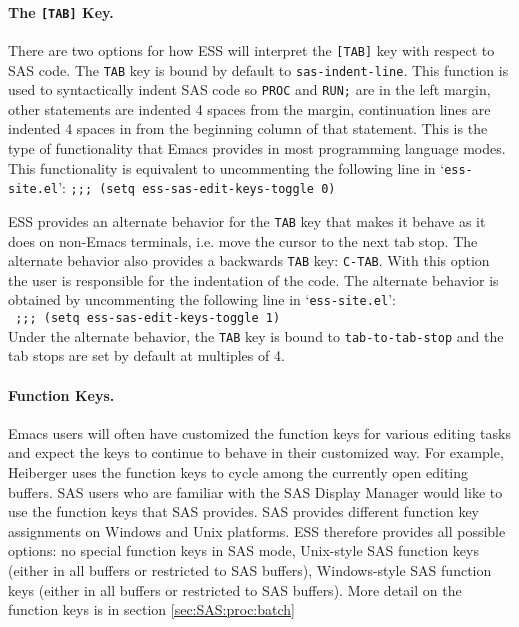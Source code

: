 \documentclass{article}
\newcommand{\stexttt}[1]{{\small\texttt{#1}}}
\newcommand{\elcode}[1]{\\{\stexttt{\hspace*{2em} #1}}\\}
\newcommand{\file}[1]{`\stexttt{#1}'}
\begin{document}
\paragraph{The \texttt{[TAB]} Key.}
\label{sec:SAS:tab}

There are two options for how ESS will interpret the \stexttt{[TAB]} key
with respect to SAS code.  The \stexttt{TAB} key is bound by default to
\stexttt{sas-indent-line}.  This function is used to syntactically indent SAS
code so \stexttt{PROC} and \stexttt{RUN;} are in the left margin, other
statements are indented 4 spaces from the margin, continuation lines
are indented 4 spaces in from the beginning column of that statement.
This is the type of functionality that Emacs provides in most
programming language modes.  This functionality is equivalent to
uncommenting the following line in \file{ess-site.el}:
\stexttt{;;; (setq ess-sas-edit-keys-toggle 0)}

ESS provides an alternate behavior for the \stexttt{TAB} key that makes it
behave as it does on non-Emacs terminals, i.e. move the cursor to the
next tab stop.  The alternate behavior also provides a backwards \stexttt{TAB}
key: \stexttt{C-TAB}.  With this option the user is responsible for the
indentation of the code.  The alternate behavior is obtained by
uncommenting the following line in \file{ess-site.el}:
\elcode{;;; (setq ess-sas-edit-keys-toggle 1)}
Under the alternate behavior, the \stexttt{TAB} key is bound to
\stexttt{tab-to-tab-stop} and the tab stops are set by default at multiples
of 4.

\paragraph{Function Keys.}
Emacs users will often have customized the function keys for various
editing tasks and expect the keys to continue to behave in their
customized way.  For example, Heiberger uses the function keys to
cycle among the currently open editing buffers.  SAS users who are
familiar with the SAS Display Manager would like to use the function
keys that SAS provides.  SAS provides different function key assignments on
Windows and Unix platforms.  ESS therefore provides all possible options: 
no special function keys in SAS mode,
Unix-style SAS function keys (either
in all buffers or restricted to SAS buffers), Windows-style SAS function
keys (either in all buffers or restricted to SAS buffers).
More detail on the function keys is in section \ref{sec:SAS:proc:batch}
\end{document}

